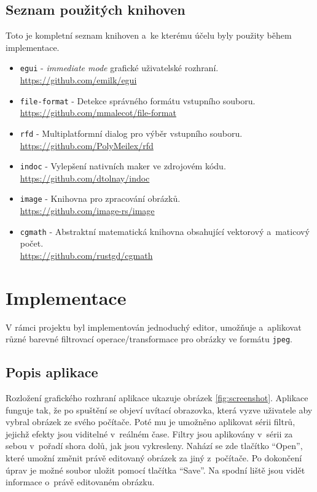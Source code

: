 \documentclass[11pt, a4paper, titlepage]{article}
\renewcommand{\uv}[1]{``#1''}
\begin{document}
\subsection{Seznam použitých knihoven}
Toto je kompletní seznam knihoven a~ke kterému účelu byly použity během implementace.
\begin{itemize}
    \item {
        \texttt{egui} - \emph{immediate mode} grafické uživatelské rozhraní.\\
        {\small\url{https://github.com/emilk/egui}}
    }
    \item {
        \texttt{file-format} - Detekce správného formátu vstupního souboru.\\
        {\small\url{https://github.com/mmalecot/file-format}}
    }
    \item {
        \texttt{rfd} - Multiplatformní dialog pro výběr vstupního souboru.\\
        {\small\url{https://github.com/PolyMeilex/rfd}}
    }
    \item {
        \texttt{indoc} - Vylepšení nativních maker ve zdrojovém kódu.\\
        {\small\url{https://github.com/dtolnay/indoc}}
    }
    \item {
        \texttt{image} - Knihovna pro zpracování obrázků.\\
        {\small\url{https://github.com/image-rs/image}}
    }
    \item {
        \texttt{cgmath} - Abstraktní matematická knihovna obsahující vektorový a~maticový počet.\\
        {\small\url{https://github.com/rustgd/cgmath}}
    }
\end{itemize}

\section{Implementace}
V rámci projektu byl implementován jednoduchý editor, umožňuje a~aplikovat různé barevné filtrovací operace/transformace pro obrázky ve formátu \texttt{jpeg}.

\subsection{Popis aplikace}

Rozložení grafického rozhraní aplikace ukazuje obrázek \ref{fig:screenshot}.
Aplikace funguje tak, že po spuštění se objeví uvítací obrazovka, která vyzve uživatele aby vybral obrázek ze svého počítače.
Poté mu je umožněno aplikovat sérii filtrů, jejichž efekty jsou viditelné v~reálném čase.
Filtry jsou aplikovány v~sérii za sebou v~pořadí shora dolů, jak jsou vykresleny.
Nahází se zde tlačítko \uv{Open}, které umožní změnit právě editovaný obrázek za jiný z~počítače.
Po dokončení úprav je možné soubor uložit pomocí tlačítka \uv{Save}.
Na spodní liště jsou vidět informace o~právě editovaném obrázku.
\end{document}
